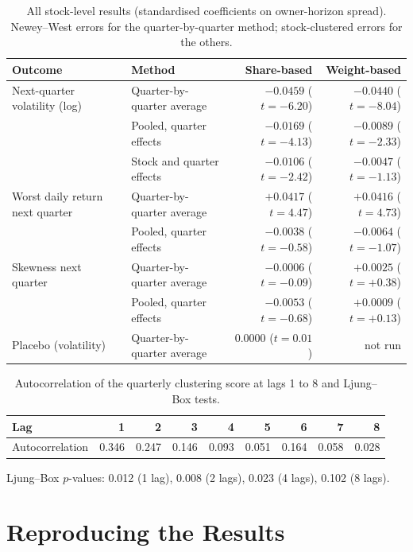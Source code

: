 \begin{table}[htbp]
\centering
\caption{All stock-level results (standardised coefficients on owner-horizon spread). Newey--West errors for the quarter-by-quarter method; stock-clustered errors for the others.}
\small
\begin{tabular}{llrr}
\toprule
Outcome & Method & Share-based & Weight-based\\
\midrule
Next-quarter volatility (log) & Quarter-by-quarter average & $-0.0459$ ($t=-6.20$) & $-0.0440$ ($t=-8.04$)\\
 & Pooled, quarter effects & $-0.0169$ ($t=-4.13$) & $-0.0089$ ($t=-2.33$)\\
 & Stock and quarter effects & $-0.0106$ ($t=-2.42$) & $-0.0047$ ($t=-1.13$)\\
Worst daily return next quarter & Quarter-by-quarter average & $+0.0417$ ($t=4.47$) & $+0.0416$ ($t=4.73$)\\
 & Pooled, quarter effects & $-0.0038$ ($t=-0.58$) & $-0.0064$ ($t=-1.07$)\\
Skewness next quarter & Quarter-by-quarter average & $-0.0006$ ($t=-0.09$) & $+0.0025$ ($t=+0.38$)\\
 & Pooled, quarter effects & $-0.0053$ ($t=-0.68$) & $+0.0009$ ($t=+0.13$)\\
Placebo (volatility) & Quarter-by-quarter average & $0.0000$ ($t=0.01$) & not run\\
\bottomrule
\end{tabular}
\end{table}

\begin{table}[htbp]
\centering
\caption{Autocorrelation of the quarterly clustering score at lags 1 to 8 and Ljung--Box tests.}
\small
\begin{tabular}{lrrrrrrrr}
\toprule
Lag & 1 & 2 & 3 & 4 & 5 & 6 & 7 & 8\\
\midrule
Autocorrelation & 0.346 & 0.247 & 0.146 & 0.093 & 0.051 & 0.164 & 0.058 & 0.028\\
\bottomrule
\end{tabular}

\vspace{4pt}
Ljung--Box $p$-values: 0.012 (1 lag), 0.008 (2 lags), 0.023 (4 lags), 0.102 (8 lags).
\end{table}

\section{Reproducing the Results}
\label{app:repro}

